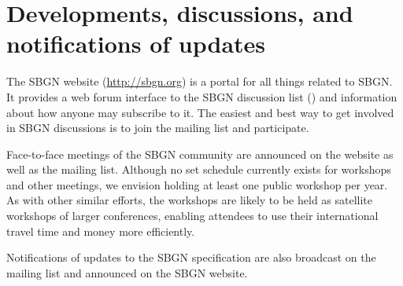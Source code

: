 \section{Developments, discussions, and notifications of updates}
\label{sec:discussions}

The SBGN website (\url{http://sbgn.org}) is a portal for all things related to SBGN.  It provides a web forum interface to the SBGN discussion list () and information about how anyone may subscribe to it.  The easiest and best way to get involved in SBGN discussions is to join the mailing list and participate.

Face-to-face meetings of the SBGN community are announced on the website as well as the mailing list.  Although no set schedule currently exists for workshops and other meetings, we envision holding at least one public workshop per year.  As with other similar efforts, the workshops are likely to be held as satellite workshops of larger conferences, enabling attendees to use their international travel time and money more efficiently.

Notifications of updates to the SBGN specification are also broadcast on the mailing list and announced on the SBGN website.



